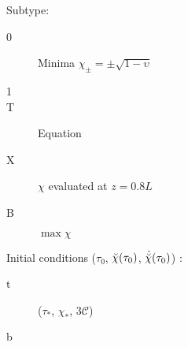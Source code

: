 \begin{draft}
{%
Subtype:
\begin{description}
    \item[0] Minima $\chi_\pm=\pm\sqrt{1-\upsilon}$
    \item[1] 
    \item[T] Equation 
    \item[X] $\chi$ evaluated at $z=0.8 L$
    \item[B] $\max{\chi}$   
\end{description}
%
Initial conditions ($\tau_0$, $\breve{\chi}(\tau_0)$, $\dot{\breve{\chi}}(\tau_0)$) :
\begin{description}
    \item[t] ($\tau_\ast$, $\chi_\ast$, $3\mathcal{C}$) 
    \item[b] 
\end{description}








}
\end{draft}







